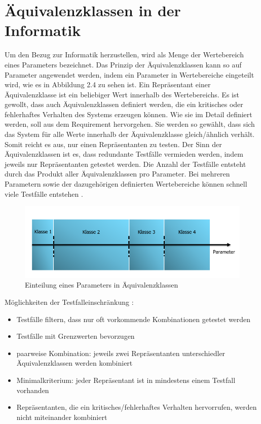 \section*{Äquivalenzklassen in der Informatik}
Um den Bezug zur Informatik herzustellen, wird als Menge der Wertebereich eines Parameters bezeichnet.
Das Prinzip der Äquivalenzklassen kann so auf Parameter angewendet werden, indem ein Parameter in Wertebereiche eingeteilt wird, wie es in Abbildung 2.4 zu sehen ist.
Ein Repräsentant einer Äquivalenzklasse ist ein beliebiger Wert innerhalb des Wertebereichs. 
Es ist gewollt, dass auch Äquivalenzklassen definiert werden, die ein kritisches oder fehlerhaftes Verhalten des Systems erzeugen können.
Wie sie im Detail definiert werden, soll aus dem Requirement hervorgehen.
Sie werden so gewählt, dass sich das System für alle Werte innerhalb der Äquivalenzklasse gleich/ähnlich verhält. Somit reicht es aus, nur 
einen Repräsentanten zu testen. 
Der Sinn der Äquivalenzklassen ist es, dass redundante Testfälle vermieden werden, indem jeweils nur Repräsentanten getestet werden.
Die Anzahl der Testfälle entsteht durch das Produkt aller Äquivalenzklassen pro Parameter. Bei mehreren Parametern sowie der dazugehörigen definierten Wertebereiche
können schnell viele Testfälle entstehen \cite[vgl.][S. 114 ff.]{equiinformatic}.\par
\begin{figure}[h]
\centering
\includegraphics[scale=1.2,]{Bilder/EquiZeitstrahl/ZeitstrahlVerschiedeneKlassenParameter.png} %
\caption{Einteilung eines Parameters in Äquivalenzklassen \cite[vgl.][S. 114 ff.]{equiinformatic}}
\end{figure}
Möglichkeiten der Testfalleinschränkung \cite[vgl.][S. 120]{equiinformatic}:
\begin{itemize}
\item Testfälle filtern, dass nur oft vorkommende Kombinationen getestet werden
\item Testfälle mit Grenzwerten bevorzugen
\item paarweise Kombination: jeweils zwei Repräsentanten unterschiedler Äquivalenzklassen werden kombiniert
\item Minimalkriterium: jeder Repräsentant ist in mindestens einem Testfall vorhanden
\item Repräsentanten, die ein kritisches/fehlerhaftes Verhalten hervorrufen, werden nicht miteinander kombiniert
\end{itemize}

